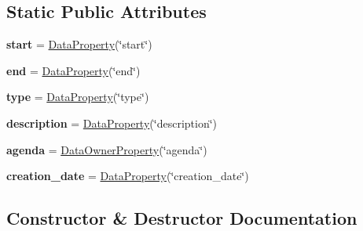 \subsection*{Static Public Attributes}
\begin{DoxyCompactItemize}
\item 
\mbox{\label{classSource_1_1core_1_1event_1_1Event_abc2dafb4e695c82d8200d9fa2d57718d}} 
{\bfseries start} = \mbox{\hyperlink{classSource_1_1core_1_1dataproperty_1_1DataProperty}{Data\+Property}}(\char`\"{}start\char`\"{})
\item 
\mbox{\label{classSource_1_1core_1_1event_1_1Event_a4c0a6edca4531d80a03b1dd7662edd7c}} 
{\bfseries end} = \mbox{\hyperlink{classSource_1_1core_1_1dataproperty_1_1DataProperty}{Data\+Property}}(\char`\"{}end\char`\"{})
\item 
\mbox{\label{classSource_1_1core_1_1event_1_1Event_aae2b1359f1cd50db08df27a2e6f036e2}} 
{\bfseries type} = \mbox{\hyperlink{classSource_1_1core_1_1dataproperty_1_1DataProperty}{Data\+Property}}(\char`\"{}type\char`\"{})
\item 
\mbox{\label{classSource_1_1core_1_1event_1_1Event_acaec09233730afab11bbf952079d62bc}} 
{\bfseries description} = \mbox{\hyperlink{classSource_1_1core_1_1dataproperty_1_1DataProperty}{Data\+Property}}(\char`\"{}description\char`\"{})
\item 
\mbox{\label{classSource_1_1core_1_1event_1_1Event_a7e87516be7f4e4f76ce36c899f7c1093}} 
{\bfseries agenda} = \mbox{\hyperlink{classSource_1_1core_1_1dataproperty_1_1DataOwnerProperty}{Data\+Owner\+Property}}(\char`\"{}agenda\char`\"{})
\item 
\mbox{\label{classSource_1_1core_1_1event_1_1Event_af242c5f37256e19fc14530215c939dec}} 
{\bfseries creation\+\_\+date} = \mbox{\hyperlink{classSource_1_1core_1_1dataproperty_1_1DataProperty}{Data\+Property}}(\char`\"{}creation\+\_\+date\char`\"{})
\end{DoxyCompactItemize}


\subsection{Constructor \& Destructor Documentation}
\mbox{\label{classSource_1_1core_1_1event_1_1Event_aa661baba9387dbb7b60fc6d90028dc2a}} 
